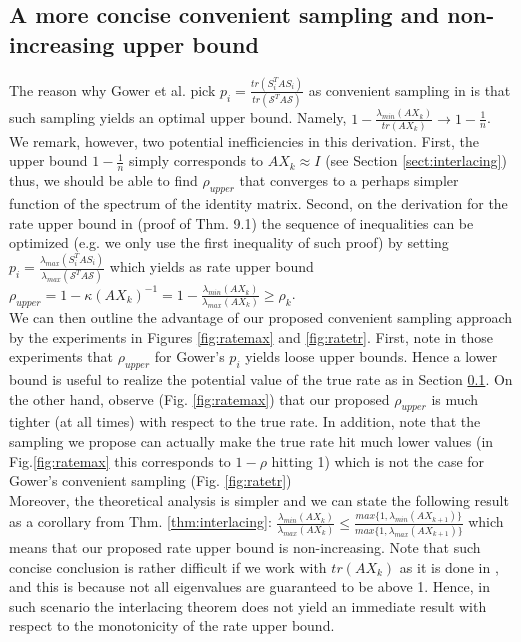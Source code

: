 \documentclass[12pt,conference,compsocconf]{IEEEtran}
\begin{document}
\subsection{A more concise convenient sampling and non-increasing upper bound}\label{sect:convsampling}
The reason why Gower et al. pick $p_i=\frac{tr(S_i^TAS_i)}{tr(\mathcal{S}^TA\mathcal{S})}$ as convenient sampling in \cite{Gower1} is that such sampling yields an optimal upper bound. Namely, $1-\frac{\lambda_{min}(AX_k)}{tr(AX_k)} \rightarrow 1-\frac{1}{n}$. We remark, however, two potential inefficiencies in this derivation. First, the upper bound $1-\frac{1}{n}$ simply corresponds to $AX_k\approx I$ (see Section \ref{sect:interlacing}) thus, we should be able to find $\rho_{upper}$ that converges to a perhaps simpler function of the spectrum of the identity matrix. Second, on the derivation for the rate upper bound in \cite{Gower1} (proof of Thm. 9.1) the sequence of inequalities can be optimized (e.g. we only use the first inequality of such proof) by setting $p_i=\frac{\lambda_{max}(S_i^TAS_i)}{\lambda_{max}(\mathcal{S}^TA\mathcal{S})}$ which yields as rate upper bound $\rho_{upper}=1-\kappa (AX_k)^{-1}=1-\frac{\lambda_{min}(AX_k)}{\lambda_{max}(AX_k)}\geq \rho_k$.\\
We can then outline the advantage of our proposed convenient sampling approach by the experiments in Figures \ref{fig:ratemax} and \ref{fig:ratetr}. First, note in those experiments that $\rho_{upper}$ for Gower's $p_i$ yields loose upper bounds. Hence a lower bound is useful to realize the potential value of the true rate as in Section \ref{sect:convsampling}. On the other hand, observe (Fig. \ref{fig:ratemax}) that our proposed $\rho_{upper}$ is much tighter (at all times) with respect to the true rate. In addition, note that the sampling we propose can actually make the true rate hit much lower values (in Fig.\ref{fig:ratemax} this corresponds to $1-\rho$ hitting 1) which is not the case for Gower's convenient sampling (Fig. \ref{fig:ratetr})\\
Moreover, the theoretical analysis is simpler and we can state the following result as a corollary from Thm. \ref{thm:interlacing}: $\frac{\lambda_{min}(AX_k)}{\lambda_{max}(AX_k)} \leq \frac{max\{1,\lambda_{min}(AX_{k+1})\}}{max\{1,\lambda_{max}(AX_{k+1})\}}$ which means that our proposed rate upper bound is non-increasing. Note that such concise conclusion is rather difficult if we work with $tr(AX_k)$ as it is done in \cite{Gower1}, and this is because not all eigenvalues are guaranteed to be above 1. Hence, in such scenario the interlacing theorem does not yield an immediate result with respect to the monotonicity of the rate upper bound.\\
\end{document}
